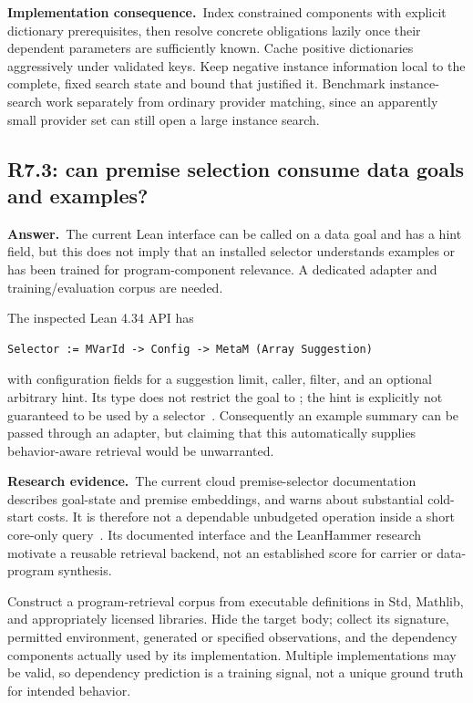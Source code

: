 \documentclass[11pt,a4paper]{article}
\theoremstyle{definition}
\theoremstyle{remark}
\newcommand{\code}[1]{\texttt{\detokenize{#1}}}
\newcommand{\ans}{\noindent\textbf{Answer.}\ }
\newcommand{\imp}{\par\noindent\textbf{Implementation consequence.}\ }
\newcommand{\lit}{\par\noindent\textbf{Research evidence.}\ }
\begin{document}
\imp Index constrained components with explicit dictionary prerequisites,
then resolve concrete obligations lazily once their dependent parameters are
sufficiently known. Cache positive dictionaries aggressively under validated
keys. Keep negative instance information local to the complete, fixed search
state and bound that justified it. Benchmark instance-search work separately
from ordinary provider matching, since an apparently small provider set can
still open a large instance search.

\subsection{R7.3: can premise selection consume data goals and examples?}\label{q:R7.3}
\ans The current Lean interface can be called on a data goal and has a hint
field, but this does not imply that an installed selector understands examples
or has been trained for program-component relevance. A dedicated adapter and
training/evaluation corpus are needed.

The inspected Lean 4.34 API has
\begin{lstlisting}
Selector := MVarId -> Config -> MetaM (Array Suggestion)
\end{lstlisting}
with configuration fields for a suggestion limit, caller, filter, and an
optional arbitrary hint. Its type does not restrict the goal to \code{Prop};
the hint is explicitly not guaranteed to be used by a selector~\cite{lean-selector-source}.
Consequently an example summary can be passed through an adapter, but claiming
that this automatically supplies behavior-aware retrieval would be unwarranted.

\lit The current cloud premise-selector documentation describes goal-state
and premise embeddings, and warns about substantial cold-start costs. It is
therefore not a dependable unbudgeted operation inside a short core-only
query~\cite{selector-readme}. Its documented interface and the LeanHammer
research motivate a reusable retrieval backend, not an established score for
carrier or data-program synthesis.

Construct a program-retrieval corpus from executable definitions in Std,
Mathlib, and appropriately licensed libraries. Hide the target body; collect
its signature, permitted environment, generated or specified observations,
and the dependency components actually used by its implementation. Multiple
implementations may be valid, so dependency prediction is a training signal,
not a unique ground truth for intended behavior.
\end{document}
